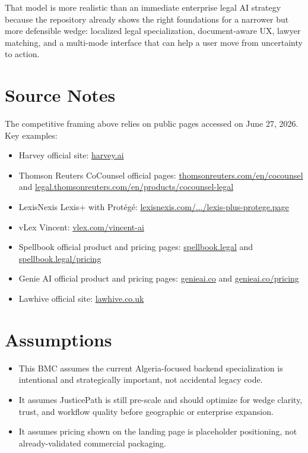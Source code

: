\documentclass[11pt]{article}
\begin{document}
That model is more realistic than an immediate enterprise legal AI strategy because the repository already shows the right foundations for a narrower but more defensible wedge: localized legal specialization, document-aware UX, lawyer matching, and a multi-mode interface that can help a user move from uncertainty to action.

\section*{Source Notes}
The competitive framing above relies on public pages accessed on June 27, 2026. Key examples:
\begin{itemize}
  \item Harvey official site: \href{https://www.harvey.ai/}{harvey.ai}
  \item Thomson Reuters CoCounsel official pages: \href{https://www.thomsonreuters.com/en/cocounsel}{thomsonreuters.com/en/cocounsel} and \href{https://legal.thomsonreuters.com/en/products/cocounsel-legal}{legal.thomsonreuters.com/en/products/cocounsel-legal}
  \item LexisNexis Lexis+ with Prot\'eg\'e: \href{https://www.lexisnexis.com/en-us/products/lexis-plus-protege.page}{lexisnexis.com/.../lexis-plus-protege.page}
  \item vLex Vincent: \href{https://vlex.com/vincent-ai}{vlex.com/vincent-ai}
  \item Spellbook official product and pricing pages: \href{https://www.spellbook.legal/}{spellbook.legal} and \href{https://www.spellbook.legal/pricing}{spellbook.legal/pricing}
  \item Genie AI official product and pricing pages: \href{https://www.genieai.co/}{genieai.co} and \href{https://www.genieai.co/pricing}{genieai.co/pricing}
  \item Lawhive official site: \href{https://lawhive.co.uk/}{lawhive.co.uk}
\end{itemize}

\section*{Assumptions}
\begin{itemize}
  \item This BMC assumes the current Algeria-focused backend specialization is intentional and strategically important, not accidental legacy code.
  \item It assumes JusticePath is still pre-scale and should optimize for wedge clarity, trust, and workflow quality before geographic or enterprise expansion.
  \item It assumes pricing shown on the landing page is placeholder positioning, not already-validated commercial packaging.
\end{itemize}
\end{document}
